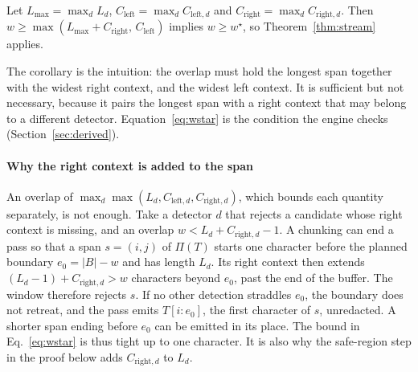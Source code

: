 \begin{corollary}\label{cor:coarse}
Let $L_{\max} = \max_d L_d$, $C_{\mathrm{left}} = \max_d C_{\mathrm{left},d}$ and $C_{\mathrm{right}} = \max_d C_{\mathrm{right},d}$. Then $w \ge \max(L_{\max} + C_{\mathrm{right}},\, C_{\mathrm{left}})$ implies $w \ge w^{\star}$, so Theorem~\ref{thm:stream} applies.
\end{corollary}

The corollary is the intuition: the overlap must hold the longest span together with the widest right context, and the widest left context. It is sufficient but not necessary, because it pairs the longest span with a right context that may belong to a different detector. Equation~\eqref{eq:wstar} is the condition the engine checks (Section~\ref{sec:derived}).

\paragraph{Why the right context is added to the span}
An overlap of $\max_d \max(L_d, C_{\mathrm{left},d}, C_{\mathrm{right},d})$, which bounds each quantity separately, is not enough. Take a detector $d$ that rejects a candidate whose right context is missing, and an overlap $w < L_d + C_{\mathrm{right},d} - 1$. A chunking can end a pass so that a span $s = (i, j)$ of $\Pi(T)$ starts one character before the planned boundary $e_0 = |B| - w$ and has length $L_d$. Its right context then extends $(L_d - 1) + C_{\mathrm{right},d} > w$ characters beyond $e_0$, past the end of the buffer. The window therefore rejects $s$. If no other detection straddles $e_0$, the boundary does not retreat, and the pass emits $T[i : e_0]$, the first character of $s$, unredacted. A shorter span ending before $e_0$ can be emitted in its place. The bound in Eq.~\eqref{eq:wstar} is thus tight up to one character. It is also why the safe-region step in the proof below adds $C_{\mathrm{right},d}$ to $L_d$.

